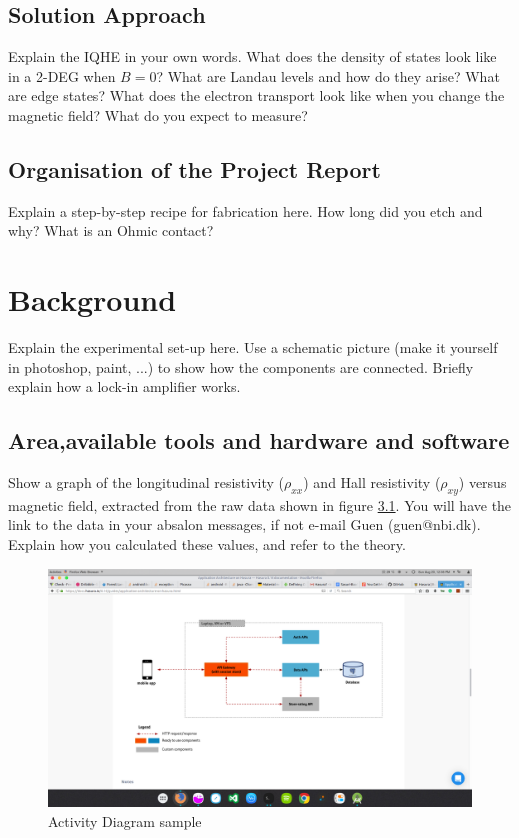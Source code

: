 \documentclass[a4paper]{report}
\begin{document}
    \section{Solution Approach}
    Explain the IQHE in your own words. What does the density of states look like in a 2-DEG when $B=0$? What are Landau levels and how do they arise? What are edge states? What does the electron transport look like when you change the magnetic field? What do you expect to measure?    
    \section{Organisation of the Project Report}    
    Explain a step-by-step recipe for fabrication here. How long did you etch and why? What is an Ohmic contact?
    
    
    \chapter {Background}
    Explain the experimental set-up here. Use a schematic picture (make it yourself in photoshop, paint, ...) to show how the components are connected. Briefly explain how a lock-in amplifier works.
    
    \section{Area,available tools and hardware and software}
    Show a graph of the longitudinal resistivity ($\rho_{xx}$) and Hall resistivity ($\rho_{xy}$) versus magnetic field, extracted from the raw data shown in figure \ref{fig:data}. You will have the link to the data in your absalon messages, if not e-mail Guen (guen@nbi.dk). Explain how you calculated these values, and refer to the theory.
    
    \begin{figure}
    \centering
    \includegraphics[width=1\textwidth]{test.png}
    \caption{\label{fig:data} Activity Diagram sample}
    \end{figure}
    
\end{document}
